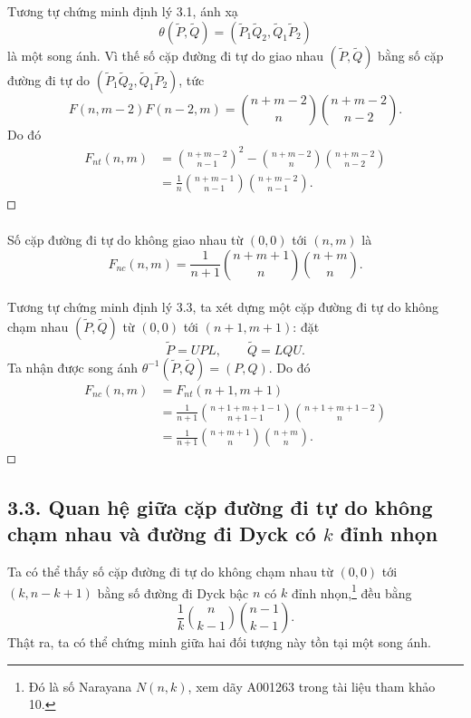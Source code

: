 \documentclass[11pt]{article}
\newcommand{\square}{\mathord{\vcenter{\hrule height .5pt
  \hbox{\vrule width .5pt height 5pt\kern5pt\vrule width .5pt}
  \hrule height .5pt}}}
\begin{document}
Tương tự chứng minh định lý 3.1, ánh xạ
\[
  \theta(\widetilde P,\widetilde Q)
  =(\widetilde P_1\widetilde Q_2,\widetilde Q_1\widetilde P_2)
\]
là một song ánh. Vì thế số cặp đường đi tự do giao nhau
\((\widetilde P,\widetilde Q)\) bằng số cặp đường đi tự do
\((\widetilde P_1\widetilde Q_2,\widetilde Q_1\widetilde P_2)\), tức
\[
  F(n,m-2)F(n-2,m)
  =\binom{n+m-2}{n}\binom{n+m-2}{n-2}.
\]
Do đó
\[
\begin{aligned}
  F_{nt}(n,m)
  &=
    \binom{n+m-2}{n-1}^2
    -\binom{n+m-2}{n}\binom{n+m-2}{n-2}\\
  &=\frac1n
    \binom{n+m-1}{n-1}
    \binom{n+m-2}{n-1}.
\end{aligned}
\]
\(\square\)

\paragraph{}
Số cặp đường đi tự do không giao nhau từ \((0,0)\) tới \((n,m)\) là
\[
  F_{nc}(n,m)
  =\frac1{n+1}
    \binom{n+m+1}{n}
    \binom{n+m}{n}. \tag{16}
\]

\paragraph{}
Tương tự chứng minh định lý 3.3, ta xét dựng một cặp đường đi tự do không chạm
nhau \((\widetilde P,\widetilde Q)\) từ \((0,0)\) tới \((n+1,m+1)\): đặt
\[
  \widetilde P=UPL,\qquad \widetilde Q=LQU.
\]
Ta nhận được song ánh \(\theta^{-1}(\widetilde P,\widetilde Q)=(P,Q)\). Do đó
\[
\begin{aligned}
  F_{nc}(n,m)
  &=F_{nt}(n+1,m+1)\\
  &=\frac1{n+1}
    \binom{n+1+m+1-1}{n+1-1}
    \binom{n+1+m+1-2}{n}\\
  &=\frac1{n+1}
    \binom{n+m+1}{n}
    \binom{n+m}{n}.
\end{aligned}
\]
\(\square\)

\subsection*{3.3. Quan hệ giữa cặp đường đi tự do không chạm nhau và đường
đi Dyck có \(k\) đỉnh nhọn}

Ta có thể thấy số cặp đường đi tự do không chạm nhau từ \((0,0)\) tới
\((k,n-k+1)\) bằng số đường đi Dyck bậc \(n\) có \(k\) đỉnh nhọn,\footnote{Đó
là số Narayana \(N(n,k)\), xem dãy A001263 trong tài liệu tham khảo 10.} đều
bằng
\[
  \frac1k\binom{n}{k-1}\binom{n-1}{k-1}.
\]
Thật ra, ta có thể chứng minh giữa hai đối tượng này tồn tại một song ánh.
\end{document}
